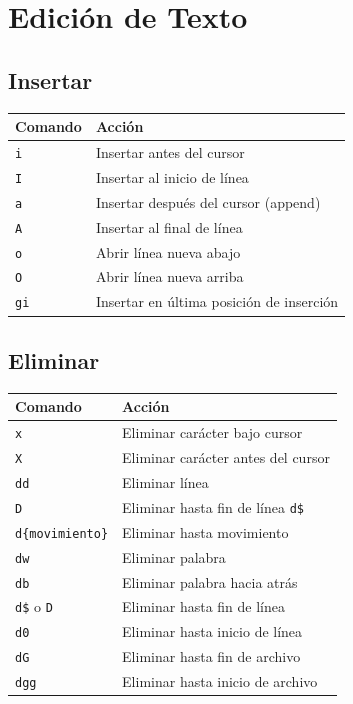 \documentclass[
  doc,
  floatsintext,
  longtable,
  a4paper,
  nolmodern,
  notxfonts,
  notimes,
  12pt,
  colorlinks=true,linkcolor=blue,citecolor=blue,urlcolor=blue]{apa7}
\newcounter{none} %
\begin{document}
\section{Edición de Texto}\label{ediciuxf3n-de-texto}

\subsection{Insertar}\label{insertar}

{\def\LTcaptype{none} %
\begin{longtable}[]{@{}ll@{}}
\toprule\noalign{}
Comando & Acción \\
\midrule\noalign{}
\endhead
\bottomrule\noalign{}
\endlastfoot
\texttt{i} & Insertar antes del cursor \\
\texttt{I} & Insertar al inicio de línea \\
\texttt{a} & Insertar después del cursor (append) \\
\texttt{A} & Insertar al final de línea \\
\texttt{o} & Abrir línea nueva abajo \\
\texttt{O} & Abrir línea nueva arriba \\
\texttt{gi} & Insertar en última posición de inserción \\
\end{longtable}
}

\subsection{Eliminar}\label{eliminar}

{\def\LTcaptype{none} %
\begin{longtable}[]{@{}ll@{}}
\toprule\noalign{}
Comando & Acción \\
\midrule\noalign{}
\endhead
\bottomrule\noalign{}
\endlastfoot
\texttt{x} & Eliminar carácter bajo cursor \\
\texttt{X} & Eliminar carácter antes del cursor \\
\texttt{dd} & Eliminar línea \\
\texttt{D} & Eliminar hasta fin de línea \texttt{d\$} \\
\texttt{d\{movimiento\}} & Eliminar hasta movimiento \\
\texttt{dw} & Eliminar palabra \\
\texttt{db} & Eliminar palabra hacia atrás \\
\texttt{d\$} o \texttt{D} & Eliminar hasta fin de línea \\
\texttt{d0} & Eliminar hasta inicio de línea \\
\texttt{dG} & Eliminar hasta fin de archivo \\
\texttt{dgg} & Eliminar hasta inicio de archivo \\
\end{longtable}
}
\end{document}
